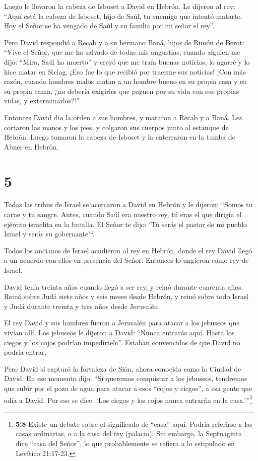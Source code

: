  Luego le llevaron la cabeza de Isboset a David en Hebrón.
Le dijeron al rey: ``Aquí está la cabeza de Isboset, hijo de Saúl, tu
enemigo que intentó matarte. Hoy el Señor se ha vengado de Saúl y su
familia por mi señor el rey''.

 Pero David respondió a Recab y a su hermano Baná, hijos de
Rimón de Berot: ``Vive el Señor, que me ha salvado de todas mis
angustias,  cuando alguien me dijo: ``Mira, Saúl ha
muerto'' y creyó que me traía buenas noticias, lo agarré y lo hice matar
en Siclag. ¡Eso fue lo que recibió por traerme sus noticias!
 ¡Con más razón, cuando hombres malos matan a un hombre
bueno en su propia casa y en su propia cama, ¿no debería exigirles que
paguen por su vida con sus propias vidas, y exterminarlos?!''

 Entonces David dio la orden a sus hombres, y mataron a
Recab y a Baná. Les cortaron las manos y los pies, y colgaron sus
cuerpos junto al estanque de Hebrón. Luego tomaron la cabeza de Isboset
y la enterraron en la tumba de Abner en Hebrón.

\hypertarget{section-4}{%
\section{5}\label{section-4}}

 Todas las tribus de Israel se acercaron a David en Hebrón y
le dijeron: ``Somos tu carne y tu sangre.  Antes, cuando
Saúl era nuestro rey, tú eras el que dirigía el ejército israelita en la
batalla. El Señor te dijo: `Tú serás el pastor de mi pueblo Israel y
serás su gobernante'``.

 Todos los ancianos de Israel acudieron al rey en Hebrón,
donde el rey David llegó a un acuerdo con ellos en presencia del Señor.
Entonces lo ungieron como rey de Israel.

 David tenía treinta años cuando llegó a ser rey, y reinó
durante cuarenta años.  Reinó sobre Judá siete años y seis
meses desde Hebrón, y reinó sobre todo Israel y Judá durante treinta y
tres años desde Jerusalén.

 El rey David y sus hombres fueron a Jerusalén para atacar a
los jebuseos que vivían allí. Los jebuseos le dijeron a David: ``Nunca
entrarás aquí. Hasta los ciegos y los cojos podrían impedírtelo''.
Estaban convencidos de que David no podría entrar.

 Pero David sí capturó la fortaleza de Sión, ahora conocida
como la Ciudad de David.  En ese momento dijo: ``Si queremos
conquistar a los jebuseos, tendremos que subir por el pozo de agua para
atacar a esos ``cojos y ciegos'', a esa gente que odia a David. Por eso
se dice: `Los ciegos y los cojos nunca entrarán en la
casa.'''\footnote{\textbf{5:8} Existe un debate sobre el significado de
  ``casa'' aquí. Podría referirse a las casas ordinarias, o a la casa
  del rey (palacio). Sin embargo, la Septuaginta dice ``casa del
  Señor'', lo que probablemente se refiera a lo estipulado en Levítico
  21:17-23.}

